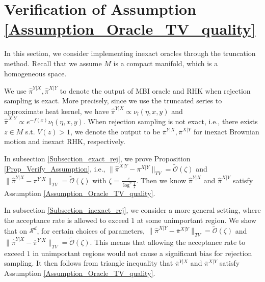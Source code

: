 \section{Verification of Assumption \ref{Assumption_Oracle_TV_quality}}\label{Section_L_infty_Varadhan}

In this section, we consider implementing inexact oracles through the truncation method. Recall that we assume $M$ is a compact manifold, which is a homogeneous space. 


We use $\hat{\pi}^{Y|X}, \hat{\pi}^{X|Y}$ to denote the output of MBI oracle and RHK when rejection sampling is exact. More precisely, since we use the truncated series to approximate heat kernel, we have $\hat{\pi}^{Y|X} \propto \nu_{l}(\eta, x, y)$  and $ \hat{\pi}^{X|Y} \propto e^{-f(x)}\nu_{l}(\eta, x, y) $. When rejection sampling is not exact, i.e., there exists $z \in M$ s.t. $V(z) > 1$, we denote the output to be $\overline{\pi}^{Y|X}, \overline{\pi}^{X|Y}$ for inexact Brownian motion and inexact RHK, respectively. 

In subsection \ref{Subsection_exact_rej}, we prove Proposition \ref{Prop_Verify_Assumption}, i.e., 
$\|\hat{\pi}^{X|Y} - \pi^{X|Y}\|_{TV} = \tilde{\mathcal{O}}(\zeta)$ and $\|\hat{\pi}^{Y|X} - \pi^{Y|X}\|_{TV} = \tilde{\mathcal{O}}(\zeta)$ with $\zeta = \frac{\varepsilon}{\log^{2} \frac{1}{\varepsilon}}$. Then we know 
$\hat{\pi}^{Y|X}$ and $\hat{\pi}^{X|Y}$ satisfy Assumption \ref{Assumption_Oracle_TV_quality}.

In subsection \ref{Subsection_inexact_rej}, we consider a more general setting, where the acceptance rate is allowed to exceed $1$ at some unimportant region. 
We show that on $\mathcal{S}^{d}$, for certain choices of parameters, $\|\hat{\pi}^{X|Y} - \overline{\pi}^{X|Y}\|_{TV} = \tilde{\mathcal{O}}(\zeta)$ and $\|\hat{\pi}^{Y|X} - \overline{\pi}^{Y|X}\|_{TV} = \tilde{\mathcal{O}}(\zeta)$. This means that allowing the acceptance rate to exceed $1$ in unimportant regions would not cause a significant bias for rejection sampling. 
It then follows from triangle inequality that $\overline{\pi}^{Y|X}$ and $\overline{\pi}^{X|Y}$ satisfy Assumption \ref{Assumption_Oracle_TV_quality}.

